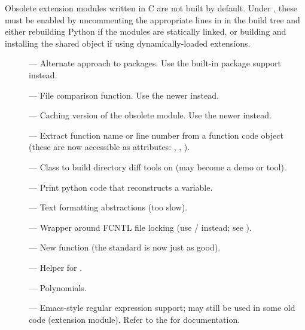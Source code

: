 Obsolete extension modules written in C are not built by default.
Under \UNIX, these must be enabled by uncommenting the appropriate
lines in  in the build tree and either rebuilding
Python if the modules are statically linked, or building and
installing the shared object if using dynamically-loaded extensions.


\begin{description}
\item[]
--- Alternate approach to packages.  Use the built-in package support
instead.

\item[]
--- File comparison function.  Use the newer  instead.

\item[]
--- Caching version of the obsolete  module.  Use the
newer  instead.

\item[]
--- Extract function name or line number from a function
code object (these are now accessible as attributes:
, ,
).

\item[]
--- Class to build directory diff tools on (may become a demo or tool).

\item[]
--- Print python code that reconstructs a variable.

\item[]
--- Text formatting abstractions (too slow).

\item[]
--- Wrapper around FCNTL file locking (use
/ instead; see ).

\item[]
--- New  function (the standard  is
now just as good).

\item[]
--- Helper for .

\item[]
--- Polynomials.

\item[]
--- Emacs-style regular expression support; may still be used in some
old code (extension module).  Refer to the
 for documentation.


\end{description}

